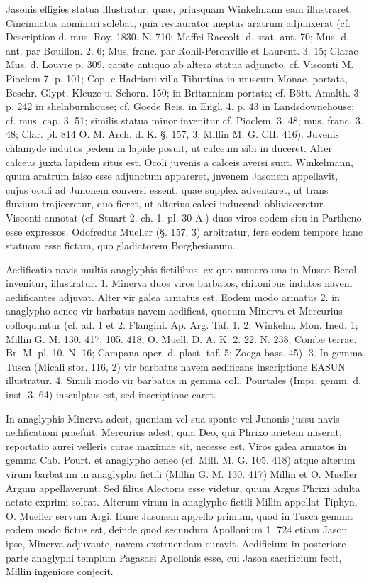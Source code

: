 \documentclass[a4paper, 11pt, oneside, polutonikogreek, german]{article}
\begin{document}
Jasonis effigies statua illustratur, quae, priusquam Winkelmann eam illustraret, Cincinnatus nominari solebat, quia restaurator ineptus aratrum adjunxerat (cf. Description d. mus. Roy. 1830. N. 710; Maffei Raccolt. d. stat. ant. 70; Mus. d. ant. par Bouillon. 2. 6; Mus. franc. par Rohil-Peronville et Laurent. 3. 15; Clarac Mus. d. Louvre p. 309, capite antiquo ab altera statua adjuncto, cf. Visconti M. Pioclem 7. p. 101; Cop. e Hadriani villa Tiburtina in museum Monac. portata, Beschr. Glypt. Kleuze u. Schorn. 150; in Britanniam portata; cf. Bött. Amalth. 3. p. 242 in shelnburnhouse; cf. Goede Reis. in Engl. 4. p. 43 in Landsdownehouse; cf. mus. cap. 3. 51; similis statua minor invenitur cf. Pioclem. 3. 48; mus. franc. 3. 48; Clar. pl. 814 O. M. Arch. d. K. §. 157, 3; Millin M. G. CII. 416). Juvenis chlamyde indutus pedem in lapide posuit, ut calceum sibi in duceret. Alter calceus juxta lapidem situs est. Ocoli juvenis a calceis aversi sunt. Winkelmann, quum aratrum falso esse adjunctum appareret, jnvenem Jasonem appellavit, cujus oculi ad Junonem conversi essent, quae supplex adventaret, ut trans fluvium trajiceretur, quo fieret, ut alterius calcei inducendi oblivisceretur. Visconti annotat (cf. Stuart 2. ch. 1. pl. 30 A.) duos viros eodem situ in Partheno esse expressos. Odofredus Mueller (§. 157, 3) arbitratur, fere eodem tempore hanc statuam esse fictam, quo gladiatorem Borghesianum.

Aedificatio navis multis anaglyphis fictilibus, ex quo numero una in Museo Berol. invenitur, illustratur. 1. Minerva duos viros barbatos, chitonibus indutos navem aedificantes adjuvat. Alter vir galea armatus est. Eodem modo armatus 2. in anaglypho aeneo vir barbatus navem aedificat, quocum Minerva et Mercurius colloquuntur (cf. ad. 1 et 2. Flangini. Ap. Arg. Taf. 1. 2; Winkelm. Mon. Ined. 1; Millin G. M. 130. 417, 105. 418; O. Muell. D. A. K. 2. 22. N. 238; Combe terrae. Br. M. pl. 10. N. 16; Campana oper. d. plast. taf. 5; Zoega bass. 45). 3. In gemma Tusca (Micali stor. 116, 2) vir barbatus navem aedificans inscriptione EASUN illustratur. 4. Simili modo vir barbatus in gemma coll. Pourtales (Impr. gemm. d. inst. 3. 64) insculptus est, sed inscriptione caret.

In anaglyphis Minerva adest, quoniam vel sua sponte vel Junonis jussu navis aedificationi praefuit. Mercurius adest, quia Deo, qui Phrixo arietem miserat, reportatio aurei velleris curae maximae sit, necesse est. Viros galea armatos in gemma Cab. Pourt. et anaglypho aeneo (cf. Mill. M. G. 105. 418) atque alterum virum barbatum in anaglypho fictili (Millin G. M. 130. 417) Millin et O. Mueller Argum appellaverunt. Sed filius Alectoris esse videtur, quum Argus Phrixi adulta aetate exprimi soleat. Alterum virum in anaglypho fictili Millin appellat Tiphyn, O. Mueller servum Argi. Hunc Jasonem appello primum, quod in Tusca gemma eodem modo fictus est, deinde quod secundum Apollonium 1. 724 etiam Jason ipse, Minerva adjuvante, navem exstruendam curavit. Aedificium in posteriore parte anaglyphi templum Pagasaei Apollonis esse, cui Jason sacrificium fecit, Millin ingeniose conjecit.
\end{document}
